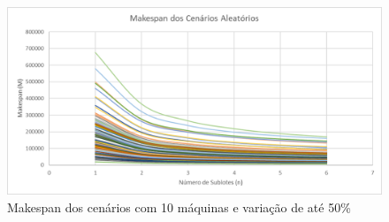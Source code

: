 \begin{figure}[!ht]
    \centering
    \includegraphics[width=12cm]{Resultados/Figuras/M10_50}
    \caption{Makespan dos cenários com 10 máquinas e variação de até 50\%}
    \label{fig:M10_50}
\end{figure}
